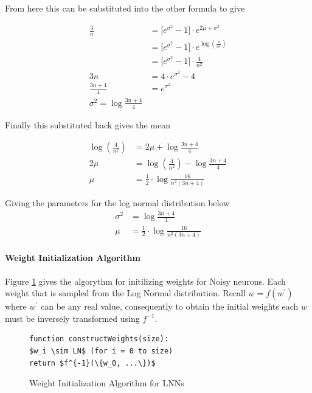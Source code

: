From here this can be substituted into the other formula to give

\begin{align*}
\frac{3}{n} &= \big[e^{\sigma^2} - 1\big] \cdot e^{2\mu + \sigma^2}\\
&= \big[e^{\sigma^2} - 1\big] \cdot e^{\log(\frac{4}{n^2})}\\
&= \big[e^{\sigma^2} - 1\big] \cdot \frac{4}{n^2}\\
3n &= 4 \cdot e^{\sigma^2} - 4\\
\frac{3n + 4}{4} &= e^{\sigma^2}\\
\sigma^2 = \log \frac{3n + 4}{4}
\end{align*}

Finally this substituted back gives the mean

\begin{align*}
\log(\frac{4}{n^2}) &= 2\mu + \log \frac{3n + 4}{4}\\
2\mu &= \log(\frac{4}{n^2}) - \log \frac{3n + 4}{4}\\
\mu &= \frac{1}{2} \cdot \log \frac{16}{n^2(3n + 4)}
\end{align*}

Giving the parameters for the log normal distribution below
\begin{align}
\sigma^2 &= \log \frac{3n + 4}{4}\\
\mu &= \frac{1}{2} \cdot \log \frac{16}{n^2(3n + 4)}
\end{align}


\noindent
\begin{minipage}[t]{0.48\textwidth}
\vspace{0px}
\paragraph{Weight Initialization Algorithm}
Figure \ref{alg:lnn-initlization} gives the algorythm for initilizing weights for Noisy neurons. Each weight that is sampled from the Log Normal distribution. Recall $w = f(w^{'})$ where $w^{'}$ can be any real value, consequently to obtain the initial weights each $w$ must be inversely transformed using $f^{-1}$.
\end{minipage}
\hspace{0.05\textwidth}
\begin{minipage}[t]{0.47\textwidth}
\vspace{0px}
\begin{figure}[H]
	\begin{lstlisting}[mathescape=true]
function constructWeights(size):
$w_i \sim LN$ (for i = 0 to size)
return $f^{-1}(\{w_0, ...\})$
\end{lstlisting}
	\caption{Weight Initialization Algorithm for LNNs}
	\label{alg:lnn-initlization}
\end{figure}
\end{minipage}

